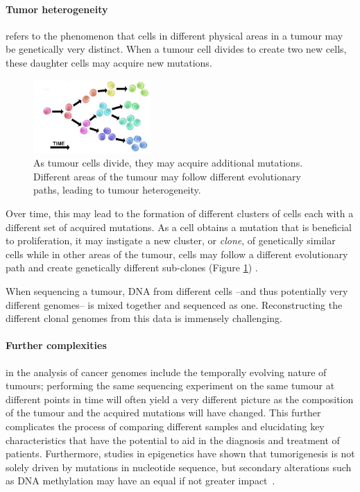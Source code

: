 \paragraph{Tumor heterogeneity} refers to the phenomenon that cells in different physical areas in a tumour may be genetically very distinct. When a tumour cell divides to create two new cells, these daughter cells may acquire new mutations.

\begin{figure}
    \centering
    \includegraphics[width=0.4\textwidth]{chapters/images/introduction/heterogeneity.jpg}

    \caption{As tumour cells divide, they may acquire additional mutations. Different areas of the tumour may follow different evolutionary paths, leading to tumour heterogeneity.}
    \label{fig:heterogeneity}
\end{figure}



Over time, this may lead to the formation of different clusters of cells each with a different set of acquired mutations. As a cell obtains a mutation that is beneficial to proliferation, it may instigate a new cluster, or \textit{clone}, of genetically similar cells while in other areas of the tumour, cells may follow a different evolutionary path and create genetically different sub-clones (Figure \ref{fig:heterogeneity}) \cite{swanton2012intratumor}.

When sequencing a tumour, DNA from different cells --and thus potentially very different genomes-- is mixed together and sequenced as one. Reconstructing the different clonal genomes from this data is immensely challenging.


\paragraph{Further complexities} in the analysis of cancer genomes include the temporally evolving nature of tumours; performing the same sequencing experiment on the same tumour at different points in time will often yield a very different picture as the composition of the tumour and the acquired mutations will have changed. This further complicates the process of comparing different samples and elucidating key characteristics that have the potential to aid in the diagnosis and treatment of patients. Furthermore, studies in epigenetics have shown that tumorigenesis is not solely driven by mutations in nucleotide sequence, but secondary alterations such as DNA methylation may have an equal if not greater impact~\cite{pacchierotti2015environmental}.

